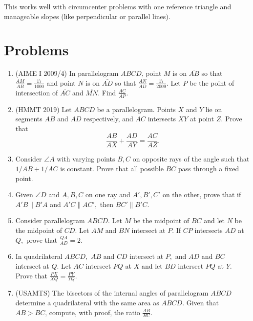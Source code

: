 \documentclass[mast]{lucky}
\begin{document}
This works well with circumcenter problems with one reference triangle and manageable slopes (like perpendicular or parallel lines).

\pagebreak

\section{Problems}


\begin{enumerate}
    \item (AIME I 2009/4) In parallelogram $ABCD$, point $M$ is on $\overline{AB}$ so that $\frac {AM}{AB} = \frac {17}{1000}$ and point $N$ is on $\overline{AD}$ so that $\frac {AN}{AD} = \frac {17}{2009}$. Let $P$ be the point of intersection of $\overline{AC}$ and $\overline{MN}$. Find $\frac {AC}{AP}$.

    \item (HMMT 2019) Let $ABCD$ be a parallelogram. Points $X$ and $Y$ lie on segments $AB$ and $AD$ respectively, and $AC$ intersects $XY$ at point $Z.$ Prove that
    $$\frac{AB}{AX}+\frac{AD}{AY}=\frac{AC}{AZ}.$$
    
    \item Consider $\angle A$ with varying points $B,C$ on opposite rays of the angle such that $1/AB+1/AC$ is constant. Prove that all possible $BC$ pass through a fixed point.
    
    \item Given $\angle D$ and $A,B,C$ on one ray and $A',B',C'$ on the other, prove that if $A'B\parallel B'A$ and $A'C\parallel AC',$ then $BC'\parallel B'C.$
    
    \item Consider parallelogram $ABCD.$ Let $M$ be the midpoint of $BC$ and let $N$ be the midpoint of $CD.$ Let $AM$ and $BN$ intersect at $P.$ If $CP$ intersects $AD$ at $Q,$ prove that $\frac{QA}{AD}=2.$
    
    \item In quadrilateral $ABCD,$ $AB$ and $CD$ intersect at $P,$ and $AD$ and $BC$ intersect at $Q.$ Let $AC$ intersect $PQ$ at $X$ and let $BD$ intersect $PQ$ at $Y.$ Prove that $\frac{PX}{XQ}=\frac{PY}{YQ}.$
    
    \item (USAMTS) The bisectors of the internal angles of parallelogram $ABCD$ determine a quadrilateral with the same area as $ABCD$. Given that $AB > BC$, compute, with proof, the ratio $\frac{AB}{BC}$.
    

\end{enumerate}
\end{document}
